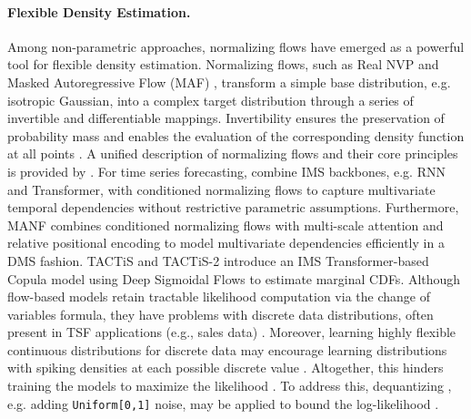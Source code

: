 \documentclass[a4paper,oneside,bibliography=totoc]{scrbook}
\begin{document}
\paragraph{Flexible Density Estimation.}
Among non-parametric approaches, normalizing flows \cite{tabak_family_2013, papamakarios_normalizing_2021} have emerged as a powerful tool for flexible density estimation.
Normalizing flows, such as Real NVP \cite{dinh_density_2017} and Masked Autoregressive Flow (MAF) \cite{papamakarios_masked_2017}, transform a simple base distribution, e.g. isotropic Gaussian, into a complex target distribution through a series of invertible and differentiable mappings. 
Invertibility ensures the preservation of probability mass and enables the evaluation of the corresponding density function at all points \cite{benidis_deep_2022}.
A unified description of normalizing flows and their core principles is provided by \citet{papamakarios_normalizing_2021}.
For time series forecasting, \citet{rasul_multivariate_2020} combine IMS backbones, e.g. RNN and Transformer, with conditioned normalizing flows to capture multivariate temporal dependencies without restrictive parametric assumptions. 
Furthermore, MANF \cite{feng_multi-scale_2024} combines conditioned normalizing flows with multi-scale attention and relative positional encoding to model multivariate dependencies efficiently in a DMS fashion. 
TACTiS and TACTiS-2 \cite{drouin_tactis_2022, ashok_tactis-2_2023} introduce an IMS Transformer-based Copula model using Deep Sigmoidal Flows \cite{huang_neural_2018} to estimate marginal CDFs. 
Although flow-based models retain tractable likelihood computation via the change of variables formula, %
they have problems with discrete data distributions, often present in TSF applications (e.g., sales data) \cite{rasul_multivariate_2020}.
Moreover, learning highly flexible continuous distributions for discrete data may encourage learning distributions with spiking densities at each possible discrete value \cite{uria_rnade_2013}.
Altogether, this hinders training the models to maximize the likelihood \cite{bergsma_c2far_2022}. 
To address this, dequantizing \cite{rasul_multivariate_2020}, e.g. adding \texttt{Uniform[0,1]} noise, may be applied to bound the log-likelihood \cite{theis_note_2016}. 
\end{document}
